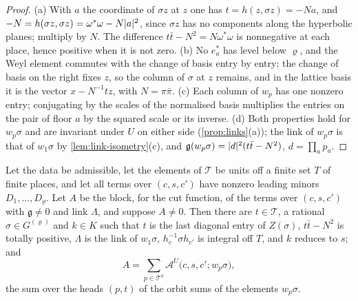 \begin{proof}
(a) With $a$ the coordinate of $\sigma z$ at $z$ one has $t=h(z,\sigma z)=-Na$, and $-N=h(\sigma z,\sigma z)=\omega^*\omega-N\lvert a\rvert^2$, since $\sigma z$ has no components along the hyperbolic planes; multiply by $N$. The difference
$t\bar t-N^2=N\omega^*\omega$ is nonnegative at each place, hence positive when it is not zero. (b) No $e^*_a$ has level below $\varrho$, and the Weyl element commutes with the change of basis entry by entry; the change of
basis on the right fixes $z$, so the column of $\sigma$ at $z$ remains, and in the lattice basis it is the vector $x-N^{-1}tz$, with $N=\pi\bar\pi$. (c) Each column of $w_p$ has one nonzero
entry; conjugating by the scales of the normalised basis multiplies the entries on the pair of floor $a$ by the squared scale or its inverse. (d) Both properties hold for $w_p\sigma$ and are invariant under $U$ on either
side (\cref{prop:links}(a)); the link of $w_p\sigma$ is that of $w_1\sigma$ by \cref{lem:link-isometry}(c), and $\mathfrak g(w_p\sigma)=\lvert d\rvert^2(t\bar t-N^2)$, $d=\prod_ap_a$.
\end{proof}

\begin{proposition}\label{prop:orbit-sums}
Let the data be admissible, let the elements of $\mathcal T$ be units off a finite set $T$ of finite places, and let all terms over $(c,s,c')$ have nonzero leading minors
$D_1,\dots,D_\varrho$. Let $A$ be the block, for the cut function, of the terms over $(c,s,c')$ with $\mathfrak g\ne0$ and link $\Lambda$, and suppose $A\ne0$. Then there are $t\in\mathcal T$,
a rational $\sigma\in G^{(\varrho)}$ and $k\in K$ such that $t$ is the last diagonal entry of $Z(\sigma)$, $t\bar t-N^2$ is totally positive, $\Lambda$ is the link of $w_1\sigma$, $h_c^{-1}\sigma h_{c'}$
is integral off $T$, and $k$ reduces to $s$; and
\[
  A=\sum_{p\in\mathcal T^\varrho}\mathcal A^U\bigl(c,s,c';w_{p}\sigma\bigr),
\]
the sum over the heads $(p,t)$ of the orbit sums of the elements $w_p\sigma$.
\end{proposition}

